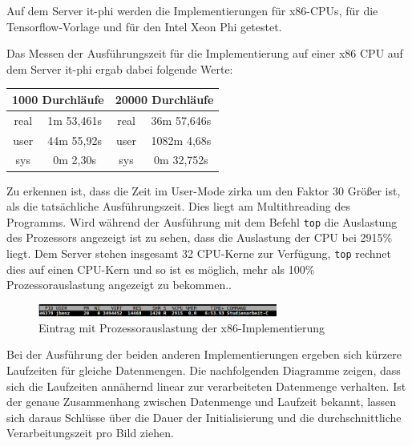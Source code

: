 \documentclass[../main.tex]{subfiles}
\begin{document}
Auf dem Server it-phi werden die Implementierungen für x86-CPUs, für die Tensorflow-Vorlage und für den Intel Xeon Phi getestet. 

Das Messen der Ausführungszeit für die Implementierung auf einer x86 CPU auf dem Server it-phi ergab dabei folgende Werte:\par

\begin{tabular}{|c|c||c|c|}
	\hline
	\multicolumn{2}{|c||}{1000 Durchläufe} & \multicolumn{2}{c|}{20000 Durchläufe} \\ \hline
	real & 1m 53,461s & real & 36m 57,646s\\ 
	\hline
	user & 44m 55,92s & user & 1082m 4,68s \\ 
	\hline
	sys & 0m 2,30s & sys & 0m 32,752s\\ 
	\hline
\end{tabular}

Zu erkennen ist, dass die Zeit im User-Mode zirka um den Faktor 30 Größer ist, als die tatsächliche Ausführungszeit.
Dies liegt am Multithreading des Programms. Wird während der Ausführung mit dem Befehl \texttt{top} die Auslastung des Prozessors angezeigt ist zu sehen, dass die Auslastung der CPU bei 2915\% liegt. Dem Server stehen insgesamt 32 CPU-Kerne zur Verfügung, \texttt{top} rechnet dies auf einen CPU-Kern und so ist es möglich, mehr als 100\% Prozessorauslastung angezeigt zu bekommen.. 
\begin{figure}[!htbp]
	\centering
	\includegraphics[width=0.7\textwidth]{../images/Benz/screenshot_top.png} %
	\caption{Eintrag mit Prozessorauslastung der x86-Implementierung} 
\end{figure}

Bei der Ausführung der beiden anderen Implementierungen ergeben sich kürzere Laufzeiten für gleiche Datenmengen. Die nachfolgenden Diagramme zeigen, dass sich die Laufzeiten annähernd linear zur verarbeiteten Datenmenge verhalten. Ist der genaue Zusammenhang zwischen Datenmenge und Laufzeit bekannt, lassen sich daraus Schlüsse über die Dauer der Initialisierung und die durchschnittliche Verarbeitungszeit pro Bild ziehen. 
\end{document}
